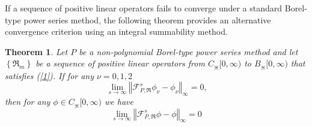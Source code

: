 \documentclass{amsart}
\newtheorem{theorem}{Theorem}
\theoremstyle{plain}
\numberwithin{equation}{section}
\begin{document}
If a sequence of positive linear operators fails to converge under a standard
Borel-type power series method, the following theorem provides an alternative
convergence criterion using an integral summability method.

\begin{theorem}
\label{theorem1}Let $P$ be a non-polynomial Borel-type power series method and
let $\left \{  \Re_{m}\right \}  $ be a sequence of positive linear operators
from $C_{\divideontimes}[0,\infty)$ to $B_{\divideontimes}[0,\infty)$ that
satisfies (\ref{1}). If for any $\nu=0,1,2$%
\begin{equation}
\lim_{s\rightarrow \infty}\left \Vert
\mathcal{F}%
_{P,\Re}^{s}\phi_{\nu}-\phi_{\nu}\right \Vert _{\infty}=0\text{,}\label{5}%
\end{equation}
then for any $\phi \in C_{\divideontimes}[0,\infty)$ we have
\begin{equation}
\lim_{s\rightarrow \infty}\left \Vert
\mathcal{F}%
_{P,\Re}^{s}\phi-\phi \right \Vert _{\infty}=0\label{4}%
\end{equation}

\end{theorem}
\end{document}
